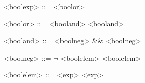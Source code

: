 \begin{grammarEx}
	<bool\textunderscore exp> ::= <bool\textunderscore or>
	
	<bool\textunderscore or> ::= <bool\textunderscore and> \textbar{}\textbar{} <bool\textunderscore and>

	<bool\textunderscore{}and> ::= <bool\textunderscore neg> \&\& <bool\textunderscore{}neg>

	<bool\textunderscore neg> ::= $\neg{}$ <bool\textunderscore elem>
	\alt <bool\textunderscore elem>

	<bool\textunderscore elem> ::= <exp>  <exp>
	\alt {}
	\alt {}
\end{grammarEx}